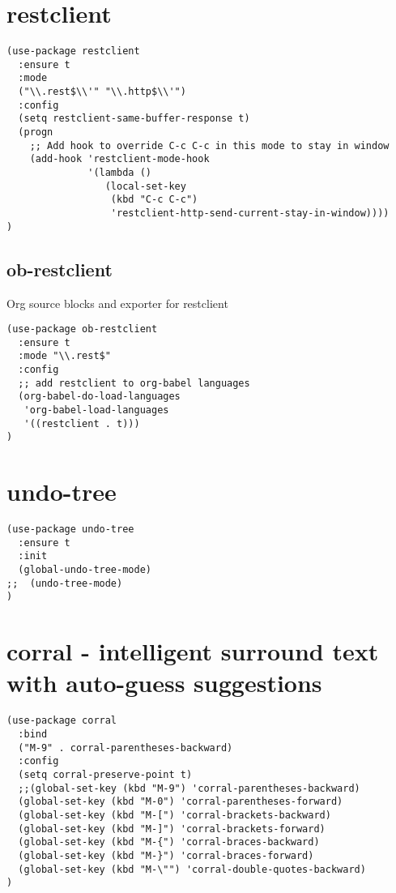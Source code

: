 \documentclass[11pt]{article}
\begin{document}
\section*{restclient}
\label{sec:orgb529589}

\begin{verbatim}
(use-package restclient
  :ensure t
  :mode
  ("\\.rest$\\'" "\\.http$\\'")
  :config
  (setq restclient-same-buffer-response t)
  (progn
    ;; Add hook to override C-c C-c in this mode to stay in window
    (add-hook 'restclient-mode-hook
              '(lambda ()
                 (local-set-key
                  (kbd "C-c C-c")
                  'restclient-http-send-current-stay-in-window))))
)
\end{verbatim}

\subsection*{ob-restclient}
\label{sec:org3308ef6}

Org source blocks and exporter for restclient

\begin{verbatim}
(use-package ob-restclient
  :ensure t
  :mode "\\.rest$"
  :config
  ;; add restclient to org-babel languages
  (org-babel-do-load-languages
   'org-babel-load-languages
   '((restclient . t)))
)
\end{verbatim}

\section*{undo-tree}
\label{sec:org427756e}
\begin{verbatim}
(use-package undo-tree
  :ensure t
  :init
  (global-undo-tree-mode)
;;  (undo-tree-mode)
)
\end{verbatim}

\section*{corral - intelligent surround text with auto-guess suggestions}
\label{sec:org7c54508}
\begin{verbatim}
(use-package corral
  :bind
  ("M-9" . corral-parentheses-backward)
  :config
  (setq corral-preserve-point t)
  ;;(global-set-key (kbd "M-9") 'corral-parentheses-backward)
  (global-set-key (kbd "M-0") 'corral-parentheses-forward)
  (global-set-key (kbd "M-[") 'corral-brackets-backward)
  (global-set-key (kbd "M-]") 'corral-brackets-forward)
  (global-set-key (kbd "M-{") 'corral-braces-backward)
  (global-set-key (kbd "M-}") 'corral-braces-forward)
  (global-set-key (kbd "M-\"") 'corral-double-quotes-backward)
)
\end{verbatim}
\end{document}
